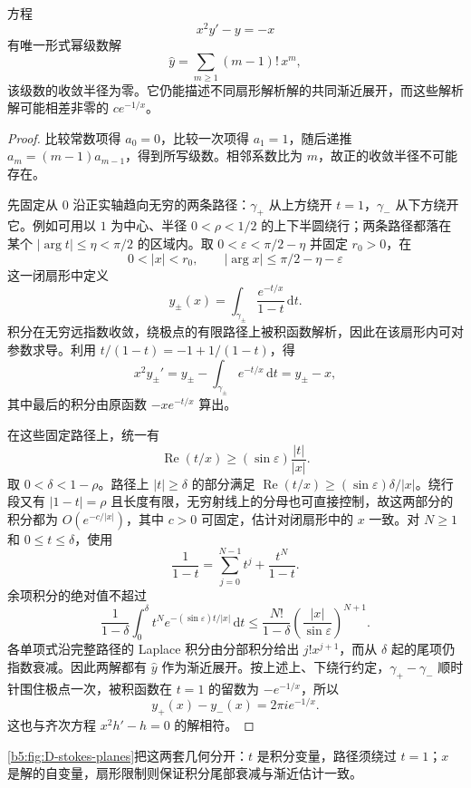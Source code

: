\begin{example}[发散形式解与扇形解]\label{b5:exm:D-euler-stokes}
	方程
	\[
		x^2y'-y=-x
	\]
	有唯一形式幂级数解
	\[
		\widehat y=\sum_{m\ge1}(m-1)!\,x^m,
	\]
	该级数的收敛半径为零。它仍能描述不同扇形解析解的共同渐近展开，而这些解析解可能相差非零的 \(ce^{-1/x}\)。
\end{example}
\begin{proof}
	比较常数项得 \(a_0=0\)，比较一次项得 \(a_1=1\)，随后递推 \(a_m=(m-1)a_{m-1}\)，得到所写级数。相邻系数比为 \(m\)，故正的收敛半径不可能存在。

	先固定从 \(0\) 沿正实轴趋向无穷的两条路径：\(\gamma_+\) 从上方绕开 \(t=1\)，\(\gamma_-\) 从下方绕开它。例如可用以 \(1\) 为中心、半径 \(0<\rho<1/2\) 的上下半圆绕行；两条路径都落在某个 \(|\arg t|\le\eta<\pi/2\) 的区域内。取 \(0<\varepsilon<\pi/2-\eta\) 并固定 \(r_0>0\)，在
	\[
		0<|x|<r_0,\qquad |\arg x|\le\pi/2-\eta-\varepsilon
	\]
	这一闭扇形中定义
	\[
		y_\pm(x)=\int_{\gamma_\pm}\frac{e^{-t/x}}{1-t}\,\mathrm{d}t.
	\]
	积分在无穷远指数收敛，绕极点的有限路径上被积函数解析，因此在该扇形内可对参数求导。利用 \(t/(1-t)=-1+1/(1-t)\)，得
	\[
		x^2y_\pm'=y_\pm-\int_{\gamma_\pm}e^{-t/x}\,\mathrm{d}t=y_\pm-x,
	\]
	其中最后的积分由原函数 \(-xe^{-t/x}\) 算出。

	在这些固定路径上，统一有
	\[
		\operatorname{Re}(t/x) \ge (\sin\varepsilon)\frac{|t|}{|x|}.
	\]
	取 \(0<\delta<1-\rho\)。路径上 \(|t|\ge\delta\) 的部分满足 \(\operatorname{Re}(t/x)\ge(\sin\varepsilon)\delta/|x|\)。绕行段又有 \(|1-t|=\rho\) 且长度有限，无穷射线上的分母也可直接控制，故这两部分的积分都为 \(O(e^{-c/|x|})\)，其中 \(c>0\) 可固定，估计对闭扇形中的 \(x\) 一致。对 \(N\ge1\) 和 \(0\le t\le\delta\)，使用
	\[
		\frac1{1-t}=\sum_{j=0}^{N-1}t^j+\frac{t^N}{1-t}.
	\]
	余项积分的绝对值不超过
	\[
		\frac1{1-\delta}\int_0^\delta t^N e^{-(\sin\varepsilon)t/|x|}\,\mathrm{d}t \le \frac{N!}{1-\delta} \left(\frac{|x|}{\sin\varepsilon}\right)^{N+1}.
	\]
	各单项式沿完整路径的 Laplace 积分由分部积分给出 \(j!x^{j+1}\)，而从 \(\delta\) 起的尾项仍指数衰减。因此两解都有 \(\widehat y\) 作为渐近展开。按上述上、下绕行约定，\(\gamma_+-\gamma_-\) 顺时针围住极点一次，被积函数在 \(t=1\) 的留数为 \(-e^{-1/x}\)，所以
	\[
		y_+(x)-y_-(x)=2\pi i e^{-1/x}.
	\]
	这也与齐次方程 \(x^2h'-h=0\) 的解相符。
\end{proof}

\cref{b5:fig:D-stokes-planes}把这两套几何分开：\(t\) 是积分变量，路径须绕过 \(t=1\)；\(x\) 是解的自变量，扇形限制则保证积分尾部衰减与渐近估计一致。


